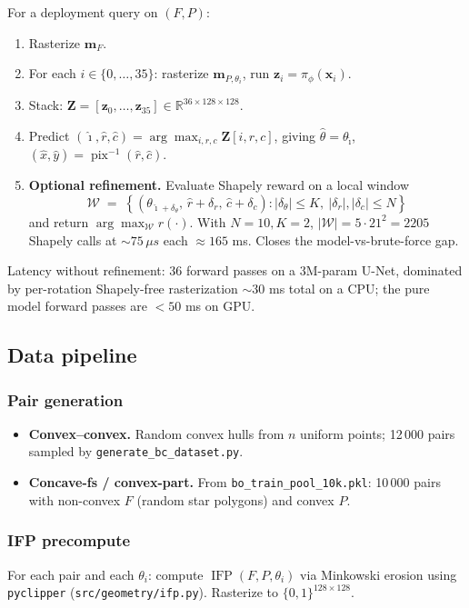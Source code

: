 \documentclass[11pt]{article}
\newcommand{\code}[1]{\texttt{#1}}
\begin{document}
For a deployment query on $(F, P)$:
\begin{enumerate}[leftmargin=*,nosep]
  \item Rasterize $\mathbf{m}_F$.
  \item For each $i \in \{0, \dots, 35\}$: rasterize $\mathbf{m}_{P,\theta_i}$, run $\mathbf{z}_i = \pi_\phi(\mathbf{x}_i)$.
  \item Stack: $\mathbf{Z} = [\mathbf{z}_0, \dots, \mathbf{z}_{35}] \in \mathbb{R}^{36\times128\times128}$.
  \item Predict $(\hat\imath, \hat r, \hat c) = \arg\max_{i,r,c} \mathbf{Z}[i,r,c]$, giving $\hat\theta = \theta_{\hat\imath}$, $(\hat x, \hat y) = \operatorname{pix}^{-1}(\hat r, \hat c)$.
  \item \textbf{Optional refinement.}  Evaluate Shapely reward on a local window
  \[
    \mathcal{W} \;=\; \left\{(\theta_{\hat\imath + \delta_\theta},\, \hat r + \delta_r,\, \hat c + \delta_c) : \lvert\delta_\theta\rvert \leq K,\ \lvert\delta_r\rvert, \lvert\delta_c\rvert \leq N\right\}
  \]
  and return $\arg\max_{\mathcal W} r(\cdot)$.  With $N = 10, K = 2$, $\lvert\mathcal{W}\rvert = 5 \cdot 21^2 = 2205$ Shapely calls at $\sim 75\,\mu s$ each $\approx 165$ ms.  Closes the model-vs-brute-force gap.
\end{enumerate}

Latency without refinement: 36 forward passes on a 3M-param U-Net, dominated by per-rotation Shapely-free rasterization $\sim 30$ ms total on a CPU; the pure model forward passes are $< 50$ ms on GPU.

\subsection{Data pipeline}

\subsubsection{Pair generation}
\begin{itemize}[leftmargin=*,nosep]
  \item \textbf{Convex--convex.}  Random convex hulls from $n$ uniform points; 12\,000 pairs sampled by \code{generate\_bc\_dataset.py}.
  \item \textbf{Concave-fs / convex-part.}  From \code{bo\_train\_pool\_10k.pkl}: 10\,000 pairs with non-convex $F$ (random star polygons) and convex $P$.
\end{itemize}

\subsubsection{IFP precompute}
For each pair and each $\theta_i$: compute $\operatorname{IFP}(F, P, \theta_i)$ via Minkowski erosion using \code{pyclipper} (\code{src/geometry/ifp.py}).  Rasterize to $\{0,1\}^{128\times128}$.
\end{document}
